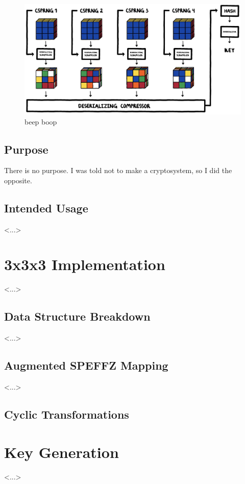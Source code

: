 \documentclass[12pt]{article}
\begin{document}
\begin{figure}[H]
    \centering
    \includegraphics[width=\textwidth]{key_gen/keygen.jpg}
    \caption{beep boop}
\end{figure}

\subsection{Purpose}
There is no purpose. I was told not to make a cryptosystem, so I did the opposite.

\subsection{Intended Usage}
<...>

\section{3x3x3 Implementation}
<...>

\subsection{Data Structure Breakdown}
<...>

\subsection{Augmented SPEFFZ Mapping}
<...>

\subsection{Cyclic Transformations}

\section{Key Generation}
<...>
\end{document}
